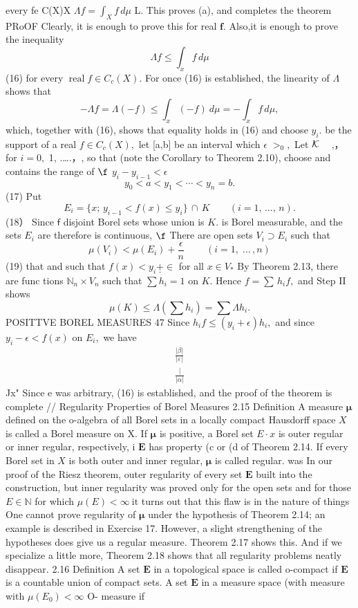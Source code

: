 every fe C(X)X $\Lambda f=\textstyle\int_{X}f\,d\mu$ L. This proves (a), and completes the theorem PRoOF Clearly, it is enough to prove this for real ${\boldsymbol{f}}.$ Also,it is enough to prove the inequality $$ \Lambda f\leq\int_{x}f\,d\mu $$ (16) for every $\operatorname{real}f\in C_{c}(X).$ For once (16) is established, the linearity of $\Lambda$ shows that $$ -\Lambda f=\Lambda(-f)\leq\int_{x}(-f)~d\mu=-\int_{x}f\,d\mu, $$ which, together with (16), shows that equality holds in (16) and choose $y_{i}.$ be the support of a real $f\in C_{c}(X),$ let [a,b] be an interval which $\scriptstyle\epsilon\;>_{0},$ Let ${\cal K}\,\,\,\,\,$ ,， for $\scriptstyle{i=0},$ 1, .….，, so that (note the Corollary to Theorem 2.10), choose and contains the range of $\boldsymbol{\f}$ $y_{i}-y_{i-1}<\epsilon$ $$ y_{0}<a<y_{1}<\cdots<y_{n}=b. $$ (17) Put $$ E_{i}=\{x;\,y_{i-1}<f(x)\leq y_{i}\}\,\cap\,K\qquad(i=1,\,\ldots,\,n). $$ (18） Since $\boldsymbol{\mathsf{f}}$ disjoint Borel sets whose union is $K.$ is Borel measurable, and the sets $\textstyle E_{i}$ are therefore is continuous, $\boldsymbol{\f}$ There are open sets $V_{i}\supset E_{i}$ such that $$ \mu(V_{i})<\mu(E_{i})+{\frac{\epsilon}{n}}\;\;\;\;\;\;\;\;(i=1,\;...\,,n) $$ (19) that and such that $f(x)<y_{i}{\underline{{+}}}\in$ for all $x\in V_{*}$ By Theorem 2.13, there are func tions $\mathbb{N}_{n}\times V_{n}$ such that $\textstyle\sum h_{i}=1$ on $K.$ Hence $f=\sum\,h_{i}f,$ and Step II shows $$ \mu(K)\leq\Lambda(\sum h_{i})=\sum\Lambda h_{i}. $$POSITTVE BOREL MEASURES $47$ Since $h_{i}f\leq(y_{i}+\epsilon)h_{i},$ and since $y_{i}-\epsilon<f(x)$ on $E_{i},$ we have $$ \begin{array}{c}{{\frac{\vert\beta\vert}{\vert\varepsilon\vert}}}\\ {{\frac{\vert}{\vert\alpha\vert}}}\end{array} $$ Jx" Since e was arbitrary, (16) is established, and the proof of the theorem is complete // Regularity Properties of Borel Measures 2.15 Definition A measure $\boldsymbol{\mu}$ defined on the o-algebra of all Borel sets in a locally compact Hausdorff space $X$ is called a Borel measure on X. If $\boldsymbol{\mu}$ is positive, a Borel set $\scriptstyle{E\cdot x}$ is outer regular or inner regular, respectively, i $\boldsymbol{E}$ has property (c or (d of Theorem 2.14. If every Borel set in $X$ is both outer and inner regular, ${\boldsymbol{\mu}}$ is called regular. was In our proof of the Riesz theorem, outer regularity of every set $\boldsymbol{E}$ built into the construction, but inner regularity was proved only for the open sets and for those $E\in\mathbb{N}$ for which $\mu(E)<\infty{\mathrm{~it}}$ turns out that this flaw is in the nature of things One cannot prove regularity of $\boldsymbol{\mu}$ under the hypothesis of Theorem 2.14; an example is described in Exercise 17. However, a slight strengthening of the hypotheses does give us a regular measure. Theorem 2.17 shows this. And if we specialize a little more, Theorem 2.18 shows that all regularity problems neatly disappear. 2.16 Definition A set $\boldsymbol{E}$ in a topological space is called o-compact if $\boldsymbol{E}$ is a countable union of compact sets. A set $\boldsymbol{E}$ in a measure space (with measure with $\mu(E_{0})<\infty$ O- measure if 